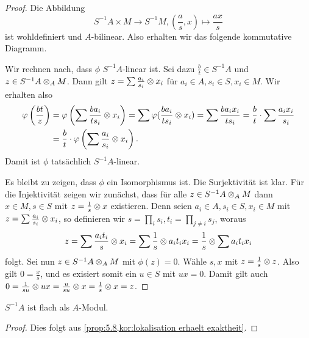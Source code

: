 \documentclass[12pt,a4paper]{scrartcl}
\theoremstyle{cplain}
\theoremstyle{cdef}
\begin{document}
\begin{proof}
	Die Abbildung \[S^{-1}A\times M\to S^{-1}M, \left(\frac as,x\right)\mapsto \frac{ax}s\]
	ist wohldefiniert und $A$-bilinear. Also erhalten wir das folgende kommutative Diagramm.
	\begin{center}
	\end{center}
	Wir rechnen nach, dass $\phi$ $S^{-1}A$-linear ist. Sei dazu $\frac bt \in S^{-1}A$ und $z\in S^{-1}A\otimes_A M$. Dann gilt $z = \sum \frac {a_i}{s_i}\otimes x_i$ für $a_i\in A, s_i\in S, x_i\in M$. Wir erhalten also
	\begin{align*}
		\varphi\left(\frac{bt} z\right) &=\varphi\left(\sum\frac{ba_i}{ts_i}\otimes x_i \right) = \sum\varphi(\frac{ba_i}{ts_i}\otimes x_i) = \sum \frac{ba_ix_i}{ts_i} = \frac{b}{t} \cdot \sum \frac{a_ix_i}{s_i} \\
		&= \frac bt \cdot \varphi\left(\sum\frac{a_i}{s_i}\otimes x_i\right).
	\end{align*}
	Damit ist $\phi$ tatsächlich $S^{-1}A$-linear.
	
	Es bleibt zu zeigen, dass $\phi$ ein Isomorphismus ist. Die Surjektivität ist klar. Für die Injektivität zeigen wir zunächst, dass für alle $z\in S^{-1}A\otimes_AM$ dann $x\in M, s\in S$ mit $z = \frac 1s\otimes x$ existieren. Denn seien $a_i\in A, s_i\in S, x_i\in M$ mit $z = \sum\frac{a_i}{s_i}\otimes x_i$, so definieren wir $s = \prod_i s_i, t_i = \prod_{j \neq i} s_j$, woraus \[z = \sum \frac{a_it_i}{s}\otimes x_i = \sum \frac 1s \otimes a_it_ix_i = \frac{1}{s}\otimes\sum a_it_ix_i\]
	folgt. Sei nun $z\in S^{-1}A\otimes_AM$ mit $\phi(z) = 0$. Wähle $s,x$ mit $z = \frac 1s\otimes z$. Also gilt $0 = \frac xs$, und es exisiert somit ein $u\in S$ mit $ux = 0$. Damit gilt auch $0 = \frac 1{su}\otimes ux = \frac{u}{su}\otimes x = \frac{1}{s}\otimes x = z$.
\end{proof}
\begin{kor}
	$S^{-1}A$ ist flach als $A$-Modul.
\end{kor}
\begin{proof}
	Dies folgt aus \cref{prop:5.8,kor:lokalisation erhaelt exaktheit}.
\end{proof}
\end{document}
